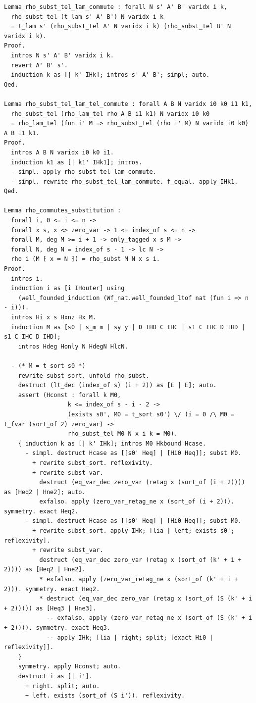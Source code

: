 \begin{latin}
\begin{verbatim}
Lemma rho_subst_tel_lam_commute : forall N s' A' B' varidx i k,
  rho_subst_tel (t_lam s' A' B') N varidx i k
  = t_lam s' (rho_subst_tel A' N varidx i k) (rho_subst_tel B' N varidx i k).
Proof.
  intros N s' A' B' varidx i k.
  revert A' B' s'.
  induction k as [| k' IHk]; intros s' A' B'; simpl; auto.
Qed.

Lemma rho_subst_tel_lam_tel_commute : forall A B N varidx i0 k0 i1 k1,
  rho_subst_tel (rho_lam_tel rho A B i1 k1) N varidx i0 k0
  = rho_lam_tel (fun i' M => rho_subst_tel (rho i' M) N varidx i0 k0) A B i1 k1.
Proof.
  intros A B N varidx i0 k0 i1.
  induction k1 as [| k1' IHk1]; intros.
  - simpl. apply rho_subst_tel_lam_commute.
  - simpl. rewrite rho_subst_tel_lam_commute. f_equal. apply IHk1.
Qed.

Lemma rho_commutes_substitution :
  forall i, 0 <= i <= n ->
  forall x s, x <> zero_var -> 1 <= index_of s <= n ->
  forall M, deg M >= i + 1 -> only_tagged x s M ->
  forall N, deg N = index_of s - 1 -> lc N ->
  rho i (M ⁅ x ≔ N ⁆) = rho_subst M N x s i.
Proof.
  intros i.
  induction i as [i IHouter] using
    (well_founded_induction (Wf_nat.well_founded_ltof nat (fun i => n - i))).
  intros Hi x s Hxnz Hx M.
  induction M as [s0 | s_m m | sy y | D IHD C IHC | s1 C IHC D IHD | s1 C IHC D IHD];
    intros Hdeg Honly N HdegN HlcN.

  - (* M = t_sort s0 *)
    rewrite subst_sort. unfold rho_subst.
    destruct (lt_dec (index_of s) (i + 2)) as [E | E]; auto.
    assert (Hconst : forall k M0,
                  k <= index_of s - i - 2 ->
                  (exists s0', M0 = t_sort s0') \/ (i = 0 /\ M0 = t_fvar (sort_of 2) zero_var) ->
                  rho_subst_tel M0 N x i k = M0).
    { induction k as [| k' IHk]; intros M0 Hkbound Hcase.
      - simpl. destruct Hcase as [[s0' Heq] | [Hi0 Heq]]; subst M0.
        + rewrite subst_sort. reflexivity.
        + rewrite subst_var.
          destruct (eq_var_dec zero_var (retag x (sort_of (i + 2)))) as [Heq2 | Hne2]; auto.
          exfalso. apply (zero_var_retag_ne x (sort_of (i + 2))). symmetry. exact Heq2.
      - simpl. destruct Hcase as [[s0' Heq] | [Hi0 Heq]]; subst M0.
        + rewrite subst_sort. apply IHk; [lia | left; exists s0'; reflexivity].
        + rewrite subst_var.
          destruct (eq_var_dec zero_var (retag x (sort_of (k' + i + 2)))) as [Heq2 | Hne2].
          * exfalso. apply (zero_var_retag_ne x (sort_of (k' + i + 2))). symmetry. exact Heq2.
          * destruct (eq_var_dec zero_var (retag x (sort_of (S (k' + i + 2))))) as [Heq3 | Hne3].
            -- exfalso. apply (zero_var_retag_ne x (sort_of (S (k' + i + 2)))). symmetry. exact Heq3.
            -- apply IHk; [lia | right; split; [exact Hi0 | reflexivity]].
    }
    symmetry. apply Hconst; auto.
    destruct i as [| i'].
      + right. split; auto.
      + left. exists (sort_of (S i')). reflexivity.


\end{verbatim}
\end{latin}
